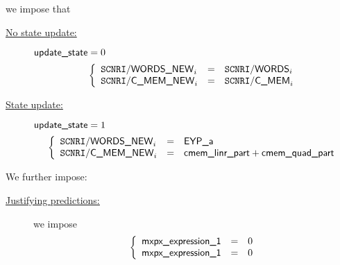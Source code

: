 \begin{description}
		we impose that
		\begin{description}
			\item[\underline{No state update:}]
				\If $\textsf{update\_state} = 0$ \Then
				\[
					\left\{ \begin{array}{lcl}
						\texttt{SCNRI}\textsf{/}{\textsf{\textsf{WORDS\_NEW}}} _{i} & = & \texttt{SCNRI}\textsf{/}{\textsf{\textsf{WORDS}}} _{i} \\
						\texttt{SCNRI}\textsf{/}{\textsf{\textsf{C\_MEM\_NEW}}}  _{i} & = & \texttt{SCNRI}\textsf{/}{\textsf{\textsf{C\_MEM}}}  _{i} \\
					\end{array} \right.
				\]
			\item[\underline{State update:}]
				\If $\textsf{update\_state} = 1$ \Then
				\[
					\left\{ \begin{array}{lcl}
						\texttt{SCNRI}\textsf{/}{\textsf{\textsf{WORDS\_NEW}}} _{i} & = & \textsf{EYP\_a}                            \\
						\texttt{SCNRI}\textsf{/}{\textsf{\textsf{C\_MEM\_NEW}}}  _{i} & = & \textsf{cmem\_linr\_part} + \textsf{cmem\_quad\_part} \\
					\end{array} \right.
				\]
		\end{description}
\end{description}

We further impose:
\begin{description}
	\item[\underline{\underline{Justifying \hubMod{} predictions:}}]
		we impose
		\[
			\left\{ \begin{array}{lcl}
				\textsf{mxpx\_expression\_1} & = & 0 \\
				\textsf{mxpx\_expression\_1} & = & 0 \\
			\end{array} \right.
		\]
\end{description}


